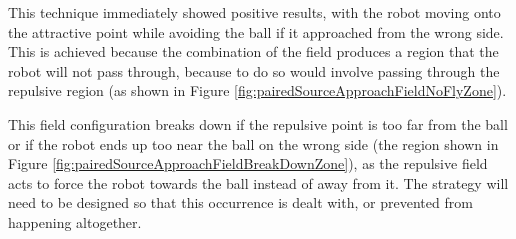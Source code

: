 \documentclass[10pt]{article}
\begin{document}
This technique immediately showed positive results, with the robot moving onto
the attractive point while avoiding the ball if it approached from the wrong
side. This is achieved because the combination of the field produces a region
that the robot will not pass through, because to do so would involve passing
through the repulsive region (as shown in Figure
\ref{fig:pairedSourceApproachFieldNoFlyZone}).

This field configuration breaks down if the repulsive point is too far from the
ball or if the robot ends up too near the ball on the wrong side (the region
shown in Figure \ref{fig:pairedSourceApproachFieldBreakDownZone}), as the
repulsive field acts to force the robot towards the ball instead of away from
it.  The strategy will need to be designed so that this occurrence is dealt
with, or prevented from happening altogether.
\end{document}
